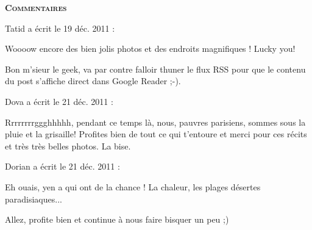 \bigskip
\textbf{\textsc{Commentaires}}

\medskip
Tatid a écrit le 19 déc. 2011 :
\begin{displayquote}
Woooow encore des bien jolis photos et des endroits magnifiques ! Lucky you!

Bon m'sieur le geek, va par contre falloir thuner le flux RSS pour que le contenu du post s'affiche direct dans Google Reader ;-).
\end{displayquote}

\medskip
Dova a écrit le 21 déc. 2011 :
\begin{displayquote}
Rrrrrrrrggghhhhh, pendant ce temps là, nous, pauvres parisiens, sommes sous la pluie et la grisaille!
Profites bien de tout ce qui t'entoure et merci pour ces récits et très très belles photos.
La bise.
\end{displayquote}

\medskip
Dorian a écrit le 21 déc. 2011 :
\begin{displayquote}
Eh ouais, yen a qui ont de la chance ! La chaleur, les plages désertes paradisiaques...

Allez, profite bien et continue à nous faire bisquer un peu ;)
\end{displayquote}

\vfill
